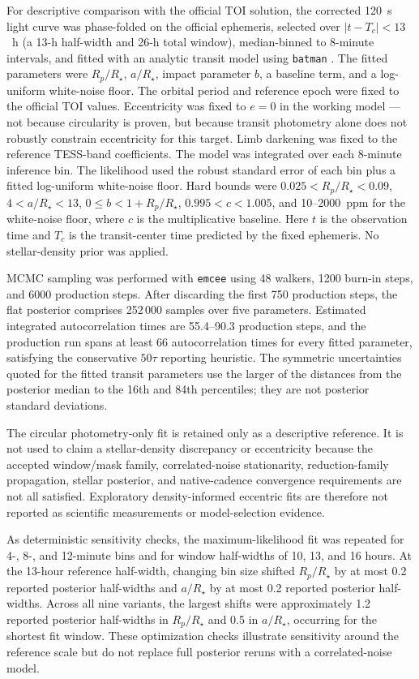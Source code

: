 \documentclass[11pt]{article}
\begin{document}
For descriptive comparison with the official TOI solution, the corrected
120~s light curve was phase-folded on the official ephemeris,
selected over $|t-T_c|<13$~h (a 13-h half-width and 26-h total window),
median-binned to 8-minute intervals, and fitted
with an analytic transit model using \texttt{batman}
\citep{Kreidberg2015}.  The fitted parameters were $R_p/R_\star$,
$a/R_\star$, impact parameter $b$, a baseline term, and a log-uniform
white-noise floor.  The orbital period
and reference epoch were fixed to the official TOI values.  Eccentricity
was fixed to $e=0$ in the working model — not because circularity is proven,
but because transit photometry alone does not robustly constrain eccentricity
for this target.  Limb darkening was fixed to the reference TESS-band
coefficients.  The model was integrated over each 8-minute inference bin.
The likelihood used the robust standard error of each bin plus a fitted
log-uniform white-noise floor.  Hard bounds were
$0.025<R_p/R_\star<0.09$, $4<a/R_\star<13$,
$0\leq b<1+R_p/R_\star$, $0.995<c<1.005$, and 10--2000~ppm for the
white-noise floor, where $c$ is the multiplicative baseline.  Here $t$ is the
observation time and $T_c$ is the transit-center time predicted by the fixed
ephemeris.  No stellar-density prior was applied.

MCMC sampling was performed with \texttt{emcee} \citep{ForemanMackey2013} using 48
walkers, 1200 burn-in steps, and 6000 production steps.  After discarding the
first 750 production steps, the flat posterior comprises 252\,000 samples
over five parameters.  Estimated integrated autocorrelation times are
55.4--90.3 production steps, and the production run spans at least 66
autocorrelation times for every fitted parameter,
satisfying the conservative $50\tau$ reporting heuristic.
The symmetric uncertainties quoted for the fitted transit parameters use the
larger of the distances from the posterior median to the 16th and 84th
percentiles; they are not posterior standard deviations.

The circular photometry-only fit is retained only as a descriptive reference.
It is not used to claim a stellar-density discrepancy or eccentricity because
the accepted window/mask family, correlated-noise stationarity, reduction-family
propagation, stellar posterior, and native-cadence convergence requirements are
not all satisfied.  Exploratory density-informed eccentric fits are therefore
not reported as scientific measurements or model-selection evidence.

As deterministic sensitivity checks, the maximum-likelihood fit was repeated
for 4-, 8-, and 12-minute bins and for window half-widths of 10, 13, and
16 hours.  At the 13-hour reference half-width, changing bin size shifted $R_p/R_\star$ by at
most 0.2 reported posterior half-widths and $a/R_\star$ by at most 0.2
reported posterior half-widths.  Across all nine variants, the largest shifts
were approximately 1.2 reported posterior half-widths in $R_p/R_\star$ and
0.5 in $a/R_\star$, occurring for the shortest fit window.  These
optimization checks illustrate sensitivity around the reference scale but do not replace full
posterior reruns with a correlated-noise model.
\end{document}

